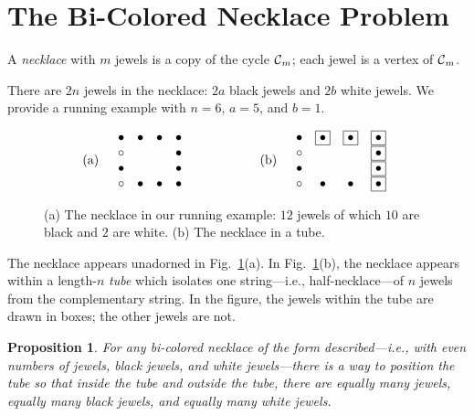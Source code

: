 \documentclass{article}
\newtheorem{prop}{Proposition}
\begin{document}
\section{The Bi-Colored Necklace Problem}


A {\it necklace} with $m$ jewels is a copy of the cycle $\mbox{$\cal C$}_m$; each jewel is a vertex of $\mbox{$\cal C$}_m$.

There are $2n$ jewels in the necklace: $2a$ black jewels and $2b$ white jewels.  We provide a  running example with $n = 6$, $a = 5$, and $b =1$.
\begin{figure}[hbt]
\small
\[
\begin{array}{cccccc}
\mbox{(a)} & 
\begin{array}{cccc}
\bullet & \bullet  & \bullet & \bullet  \\
\circ    &             &            & \bullet  \\
\bullet &             &            & \bullet  \\
\circ    &  \bullet  & \bullet & \bullet
\end{array}
  & \hspace*{.5in} &
\mbox{(b)} & 
\begin{array}{cccc}
\bullet & \fbox{$\bullet$} & \fbox{$\bullet$} & \fbox{$\bullet$}  \\
\circ    &                          &                          & \fbox{$\bullet$}  \\
\bullet &                          &                          & \fbox{$\bullet$}  \\
\circ    &  \bullet              &   \bullet              & \fbox{$\bullet$}
\end{array}
\end{array}
\]
\caption{(a) The necklace in our running example: $12$ jewels of which $10$ are black and $2$ are white.  (b) The necklace in a tube.}
\label{fig:sample-necklace}
\end{figure}
The necklace appears unadorned in Fig.~\ref{fig:sample-necklace}(a).  In Fig.~\ref{fig:sample-necklace}(b), the necklace appears within a length-$n$ {\it tube} which isolates one string---i.e., half-necklace---of $n$ jewels from the complementary string.  In the figure, the jewels within the tube are drawn in boxes; the other jewels are not.


\smallskip

\begin{prop}
For any bi-colored necklace of the form described---i.e., with even numbers of jewels, black jewels, and white jewels---there is a way to position the tube so that inside the tube and outside the tube, there are equally many jewels, equally many black jewels, and equally many white jewels.
\end{prop} 
\end{document}
